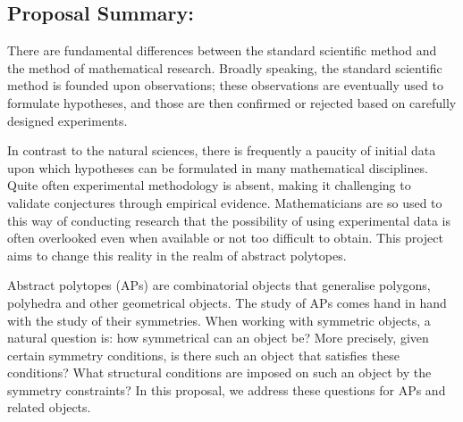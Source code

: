 \subsection*{Proposal Summary:}



% 

There are fundamental differences between the standard scientific method and the method of mathematical research. Broadly speaking, the standard scientific method is founded upon observations; these observations  are eventually used to formulate hypotheses, and those are then confirmed or rejected based on carefully designed experiments. 

In contrast to the natural sciences, 
there is frequently a paucity of initial data upon which hypotheses can be formulated in many mathematical disciplines. 
Quite often experimental methodology is absent, making it challenging to validate conjectures through empirical evidence. Mathematicians are so used to this way of conducting research that the possibility of using experimental data is often overlooked even when available or not too difficult to obtain. This project aims to change this reality in the realm of abstract polytopes.

Abstract polytopes (APs) are combinatorial objects that generalise polygons, polyhedra and other geometrical objects. The study of APs comes hand in hand with the study of their symmetries. When working with symmetric objects, a natural question is: how symmetrical can an object be? More precisely, given certain symmetry conditions, is there such an object that satisfies these conditions? What structural conditions are imposed on such an object by the symmetry constraints? In this proposal, we address these questions for APs and related objects.  

